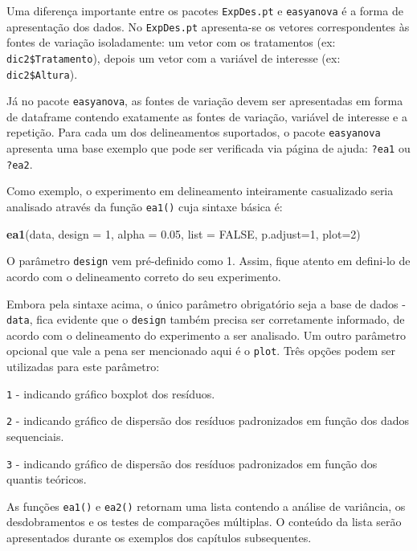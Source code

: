 \documentclass[
]{article}
\newenvironment{Shaded}{\begin{snugshade}}{\end{snugshade}}
\newcommand{\DataTypeTok}[1]{\textcolor[rgb]{0.13,0.29,0.53}{#1}}
\newcommand{\DecValTok}[1]{\textcolor[rgb]{0.00,0.00,0.81}{#1}}
\newcommand{\FloatTok}[1]{\textcolor[rgb]{0.00,0.00,0.81}{#1}}
\newcommand{\KeywordTok}[1]{\textcolor[rgb]{0.13,0.29,0.53}{\textbf{#1}}}
\newcommand{\NormalTok}[1]{#1}
\newcommand{\OtherTok}[1]{\textcolor[rgb]{0.56,0.35,0.01}{#1}}
\begin{document}
Uma diferença importante entre os pacotes \texttt{ExpDes.pt} e \texttt{easyanova} é a forma de apresentação dos dados. No \texttt{ExpDes.pt} apresenta-se os vetores correspondentes às fontes de variação isoladamente: um vetor com os tratamentos (ex: \texttt{dic2\$Tratamento}), depois um vetor com a variável de interesse (ex: \texttt{dic2\$Altura}).

Já no pacote \texttt{easyanova}, as fontes de variação devem ser apresentadas em forma de dataframe contendo exatamente as fontes de variação, variável de interesse e a repetição. Para cada um dos delineamentos suportados, o pacote \texttt{easyanova} apresenta uma base exemplo que pode ser verificada via página de ajuda: \texttt{?ea1} ou \texttt{?ea2}.

Como exemplo, o experimento em delineamento inteiramente casualizado seria analisado através da função \texttt{ea1()} cuja sintaxe básica é:

\begin{Shaded}
\begin{Highlighting}[]
\KeywordTok{ea1}\NormalTok{(data, }\DataTypeTok{design =} \DecValTok{1}\NormalTok{, }\DataTypeTok{alpha =} \FloatTok{0.05}\NormalTok{, }\DataTypeTok{list =} \OtherTok{FALSE}\NormalTok{, }\DataTypeTok{p.adjust=}\DecValTok{1}\NormalTok{, }\DataTypeTok{plot=}\DecValTok{2}\NormalTok{)}
\end{Highlighting}
\end{Shaded}

O parâmetro \texttt{design} vem pré-definido como 1. Assim, fique atento em defini-lo de acordo com o delineamento correto do seu experimento.

Embora pela sintaxe acima, o único parâmetro obrigatório seja a base de dados - \texttt{data}, fica evidente que o \texttt{design} também precisa ser corretamente informado, de acordo com o delineamento do experimento a ser analisado. Um outro parâmetro opcional que vale a pena ser mencionado aqui é o \texttt{plot}. Três opções podem ser utilizadas para este parâmetro:

\texttt{1} - indicando gráfico boxplot dos resíduos.

\texttt{2} - indicando gráfico de dispersão dos resíduos padronizados em função dos dados sequenciais.

\texttt{3} - indicando gráfico de dispersão dos resíduos padronizados em função dos quantis teóricos.

As funções \texttt{ea1()} e \texttt{ea2()} retornam uma lista contendo a análise de variância, os desdobramentos e os testes de comparações múltiplas. O conteúdo da lista serão apresentados durante os exemplos dos capítulos subsequentes.
\end{document}
